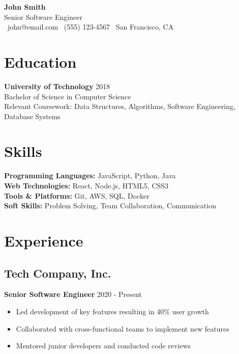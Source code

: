 \documentclass[11pt,a4paper]{article}
\begin{document}
\begin{center}
    {\Huge\textbf{\textcolor{primary}{John Smith}}}\\[6pt]
    {\large\textcolor{accent}{Senior Software Engineer}}\\[6pt]
    \textcolor{subtext}{
        \faEnvelope\ john@email.com \quad
        \faPhone\ (555) 123-4567 \quad
        \faMapMarker\ San Francisco, CA
    }
\end{center}

\vspace{0.5em}

\section{Education}
\textbf{University of Technology} \hfill \textcolor{subtext}{2018}\\
Bachelor of Science in Computer Science\\
\textcolor{subtext}{Relevant Coursework: Data Structures, Algorithms, Software Engineering, Database Systems}

\section{Skills}
\textbf{\textcolor{accent}{Programming Languages:}} JavaScript, Python, Java\\
\textbf{\textcolor{accent}{Web Technologies:}} React, Node.js, HTML5, CSS3\\
\textbf{\textcolor{accent}{Tools \& Platforms:}} Git, AWS, SQL, Docker\\
\textbf{\textcolor{accent}{Soft Skills:}} Problem Solving, Team Collaboration, Communication

\section{Experience}
\subsection*{Tech Company, Inc.}
\textbf{\textcolor{accent}{Senior Software Engineer}} \hfill \textcolor{subtext}{2020 - Present}
\begin{itemize}[leftmargin=*]
    \item Led development of key features resulting in 40\% user growth
    \item Collaborated with cross-functional teams to implement new features
    \item Mentored junior developers and conducted code reviews
\end{itemize}
\end{document}
